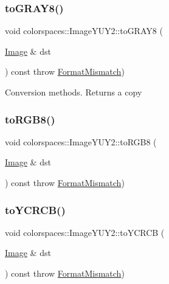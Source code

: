\mbox{\label{classcolorspaces_1_1_image_y_u_y2_a48eb29de1f18175ce5c7c2d57a1de648}} 
\subsubsection{\texorpdfstring{to\+G\+R\+A\+Y8()}{toGRAY8()}}
{\footnotesize\ttfamily void colorspaces\+::\+Image\+Y\+U\+Y2\+::to\+G\+R\+A\+Y8 (\begin{DoxyParamCaption}\item[{\hyperlink{classcolorspaces_1_1_image}{Image} \&}]{dst }\end{DoxyParamCaption}) const throw  \hyperlink{classcolorspaces_1_1_image_1_1_format_mismatch}{Format\+Mismatch}) }

Conversion methods. Returns a copy \mbox{\label{classcolorspaces_1_1_image_y_u_y2_a2fd187ef7a820405b6ca0d29589cab04}} 
\subsubsection{\texorpdfstring{to\+R\+G\+B8()}{toRGB8()}}
{\footnotesize\ttfamily void colorspaces\+::\+Image\+Y\+U\+Y2\+::to\+R\+G\+B8 (\begin{DoxyParamCaption}\item[{\hyperlink{classcolorspaces_1_1_image}{Image} \&}]{dst }\end{DoxyParamCaption}) const throw  \hyperlink{classcolorspaces_1_1_image_1_1_format_mismatch}{Format\+Mismatch}) }

\mbox{\label{classcolorspaces_1_1_image_y_u_y2_a2aa1dd77495bccf2f588a0dd620e7bbb}} 
\subsubsection{\texorpdfstring{to\+Y\+C\+R\+C\+B()}{toYCRCB()}}
{\footnotesize\ttfamily void colorspaces\+::\+Image\+Y\+U\+Y2\+::to\+Y\+C\+R\+CB (\begin{DoxyParamCaption}\item[{\hyperlink{classcolorspaces_1_1_image}{Image} \&}]{dst }\end{DoxyParamCaption}) const throw  \hyperlink{classcolorspaces_1_1_image_1_1_format_mismatch}{Format\+Mismatch}) }



